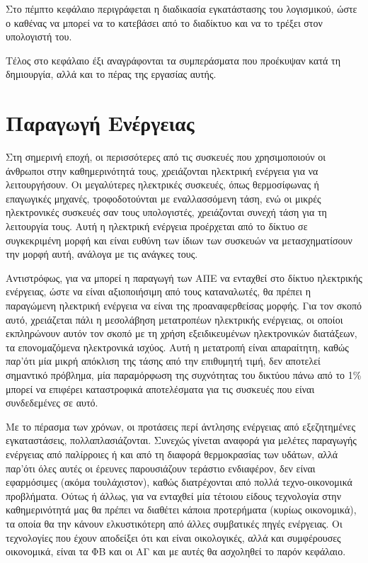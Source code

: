 \documentclass[12pt]{report}
\begin{document}
Στο πέμπτο κεφάλαιο περιγράφεται η διαδικασία εγκατάστασης του λογισμικού, ώστε ο καθένας να μπορεί να το κατεβάσει από το διαδίκτυο και να το τρέξει στον υπολογιστή του.

Τέλος στο κεφάλαιο έξι αναγράφονται τα συμπεράσματα που προέκυψαν κατά τη δημιουργία, αλλά και το πέρας της εργασίας αυτής.

\chapter{Παραγωγή Ενέργειας}
Στη σημερινή εποχή, οι περισσότερες από τις συσκευές που χρησιμοποιούν οι άνθρωποι στην καθημερινότητά τους, χρειάζονται ηλεκτρική ενέργεια για να λειτουργήσουν. Οι μεγαλύτερες ηλεκτρικές συσκευές, όπως θερμοσίφωνας ή επαγωγικές
μηχανές, τροφοδοτούνται με εναλλασσόμενη τάση, ενώ οι μικρές ηλεκτρονικές συσκευές σαν τους υπολογιστές, χρειάζονται συνεχή τάση για τη λειτουργία τους. Αυτή η ηλεκτρική ενέργεια προέρχεται από το δίκτυο σε συγκεκριμένη μορφή
{} και είναι ευθύνη των ίδιων των συσκευών να μετασχηματίσουν την μορφή αυτή, ανάλογα με τις ανάγκες τους.

Αντιστρόφως, για να μπορεί η παραγωγή των ΑΠΕ να ενταχθεί στο δίκτυο ηλεκτρικής ενέργειας, ώστε να είναι αξιοποιήσιμη από τους καταναλωτές, θα πρέπει η παραγώμενη ηλεκτρική ενέργεια να είναι της προαναφερθείσας μορφής. Για τον σκοπό 
αυτό, χρειάζεται πάλι η μεσολάβηση μετατροπέων ηλεκτρικής ενέργειας, οι οποίοι εκπληρώνουν αυτόν τον σκοπό με τη χρήση εξειδικευμένων ηλεκτρονικών διατάξεων, τα επονομαζόμενα ηλεκτρονικά ισχύος. Αυτή 
η μετατροπή είναι απαραίτητη, καθώς παρ'ότι μία μικρή απόκλιση της τάσης από την επιθυμητή τιμή, δεν αποτελεί σημαντικό πρόβλημα, μία παραμόρφωση της συχνότητας του δικτύου πάνω από το 1\% μπορεί να επιφέρει καταστροφικά αποτελέσματα
για τις συσκευές που είναι συνδεδεμένες σε αυτό. 

Με το πέρασμα των χρόνων, οι προτάσεις περί άντλησης ενέργειας από εξεζητημένες εγκαταστάσεις, πολλαπλασιάζονται. Συνεχώς γίνεται αναφορά για μελέτες παραγωγής ενέργειας από παλίρροιες ή και από τη διαφορά θερμοκρασίας των υδάτων, 
αλλά παρ'ότι όλες αυτές οι έρευνες παρουσιάζουν τεράστιο ενδιαφέρον, δεν είναι εφαρμόσιμες (ακόμα τουλάχιστον), καθώς διατρέχονται από πολλά τεχνο-οικονομικά προβλήματα. Ούτως ή άλλως, για να ενταχθεί μία τέτοιου είδους τεχνολογία 
στην καθημερινότητά μας θα πρέπει να διαθέτει κάποια προτερήματα (κυρίως οικονομικά), τα οποία θα την κάνουν ελκυστικότερη από άλλες συμβατικές πηγές ενέργειας. Οι τεχνολογίες που έχουν αποδείξει ότι και είναι οικολογικές, αλλά και 
συμφέρουσες οικονομικά, είναι τα ΦΒ και οι ΑΓ και με αυτές θα ασχοληθεί το παρόν κεφάλαιο. 
\end{document}
